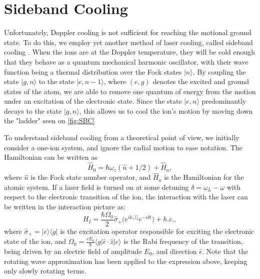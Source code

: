 \section{Sideband Cooling}
\label{sec:SBC}
Unfortunately, Doppler cooling is not sufficient for reaching the motional ground state. To do this, we employ yet another method of laser cooling, called sideband cooling \cite{WinelandSideband}. When the ions are at the Doppler temperature, they will be cold enough that they behave as a quantum mechanical harmonic oscillator, with their wave function
being a thermal distribution over the Fock states $\vert n \rangle$. By coupling the state $\vert g,n\rangle$ to the state $\vert e,n-1\rangle$, where $(e,g)$ denotes the excited and ground states of the atom, we are able to remove one quantum of energy from the motion under an excitation of the electronic state.
Since the state $\vert e,n\rangle$ predominantly decays to the state  $\vert g,n\rangle$, this allows us to cool the ion's motion by moving down the "ladder" seen on \cref{fig:SBC}


To understand sideband cooling from a theoretical point of view, we initially consider a one-ion system, and ignore the radial motion to ease notation. The Hamiltonian can be written as
\begin{equation}
    \hat{H}_0 = \hbar\omega_{z}(\hat{n}+1/2)+\hat{H}_a,
\end{equation}
where $\hat{n}$ is the Fock state number operator, and $\hat{H}_a$ is the Hamiltonian for the atomic system. If a laser field is turned on at some detuning $\delta = \omega_L -\omega$ with respect to the electronic transition of the ion, the interaction with the laser can be written in the interaction picture as:
\begin{equation}
    H_{I} = \frac{\hbar\Omega_0}{2}\hat{\sigma}_+\big(e^{ik_z\hat{z_I}}e^{-i\delta t}\big) + h.c.,
    \label{eq:interaction}
\end{equation}
where $\hat{\sigma}_+ = \vert e \rangle \langle g \vert$ is the excitation operator responsible for exciting the electronic state of the ion, and $\Omega_0 = \frac{eE_0}{\hbar}\langle g \vert \hat{\epsilon}\cdot\hat{z}\vert e\rangle$ is the Rabi frequency of the transition, being driven by an electric field of amplitude $E_0$, and direction $\hat{\epsilon}$. Note that the rotating wave approximation has been applied to the expression above, keeping only slowly rotating terms.


